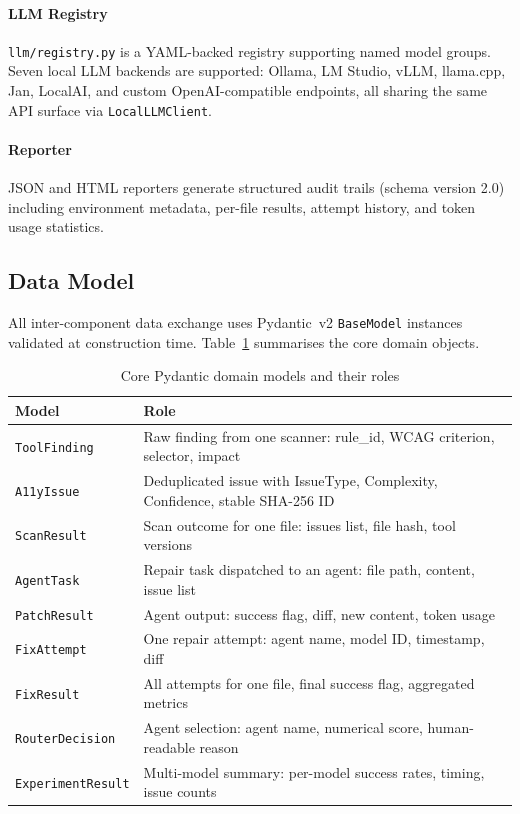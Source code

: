 \documentclass[10pt,conference]{IEEEtran}
\begin{document}
\paragraph{LLM Registry} \texttt{llm/registry.py} is a YAML-backed registry
supporting named model groups.  Seven local LLM backends are supported:
Ollama, LM Studio, vLLM, llama.cpp, Jan, LocalAI, and custom
OpenAI-compatible endpoints, all sharing the same API surface via
\texttt{LocalLLMClient}.

\paragraph{Reporter} JSON and HTML reporters generate structured audit trails
(schema version 2.0) including environment metadata, per-file results,
attempt history, and token usage statistics.

\subsection{Data Model}

All inter-component data exchange uses Pydantic~v2 \texttt{BaseModel}
instances validated at construction time.  Table~\ref{tab:models} summarises
the core domain objects.

\begin{table}[htbp]
\caption{Core Pydantic domain models and their roles}
\label{tab:models}
\centering\small
\begin{tabularx}{\columnwidth}{lX}
\toprule
\textbf{Model} & \textbf{Role} \\
\midrule
\texttt{ToolFinding}  & Raw finding from one scanner: rule\_id, WCAG criterion, selector, impact \\
\texttt{A11yIssue}    & Deduplicated issue with IssueType, Complexity, Confidence, stable SHA-256 ID \\
\texttt{ScanResult}   & Scan outcome for one file: issues list, file hash, tool versions \\
\texttt{AgentTask}    & Repair task dispatched to an agent: file path, content, issue list \\
\texttt{PatchResult}  & Agent output: success flag, diff, new content, token usage \\
\texttt{FixAttempt}   & One repair attempt: agent name, model ID, timestamp, diff \\
\texttt{FixResult}    & All attempts for one file, final success flag, aggregated metrics \\
\texttt{RouterDecision} & Agent selection: agent name, numerical score, human-readable reason \\
\texttt{ExperimentResult} & Multi-model summary: per-model success rates, timing, issue counts \\
\bottomrule
\end{tabularx}
\end{table}
\end{document}
